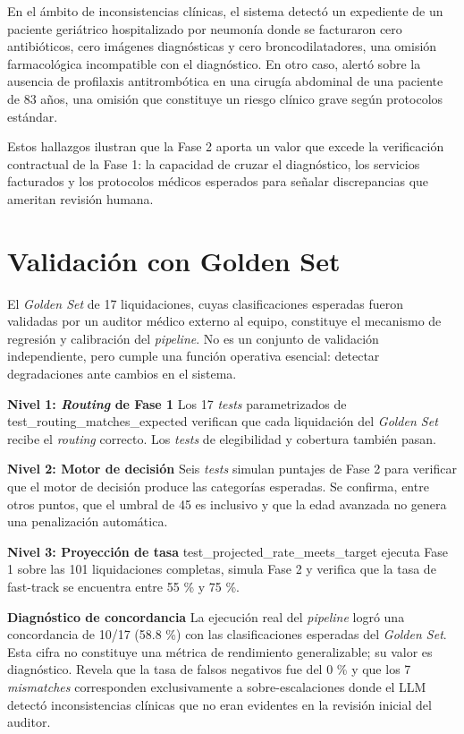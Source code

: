 En el ámbito de inconsistencias clínicas, el sistema detectó un expediente de un paciente geriátrico hospitalizado por neumonía donde se facturaron cero antibióticos, cero imágenes diagnósticas y cero broncodilatadores, una omisión farmacológica incompatible con el diagnóstico. En otro caso, alertó sobre la ausencia de profilaxis antitrombótica en una cirugía abdominal de una paciente de 83 años, una omisión que constituye un riesgo clínico grave según protocolos estándar.

Estos hallazgos ilustran que la Fase 2 aporta un valor que excede la verificación contractual de la Fase 1: la capacidad de cruzar el diagnóstico, los servicios facturados y los protocolos médicos esperados para señalar discrepancias que ameritan revisión humana.

\section{Validación con Golden Set}

El \textit{Golden Set} de 17 liquidaciones, cuyas clasificaciones esperadas fueron validadas por un auditor médico externo al equipo, constituye el mecanismo de regresión y calibración del \textit{pipeline}. No es un conjunto de validación independiente, pero cumple una función operativa esencial: detectar degradaciones ante cambios en el sistema.

\textbf{Nivel 1: \textit{Routing} de Fase 1} Los 17 \textit{tests} parametrizados de test\_routing\_matches\_expected verifican que cada liquidación del \textit{Golden Set} recibe el \textit{routing} correcto. Los \textit{tests} de elegibilidad y cobertura también pasan.

\textbf{Nivel 2: Motor de decisión} Seis \textit{tests} simulan puntajes de Fase 2 para verificar que el motor de decisión produce las categorías esperadas. Se confirma, entre otros puntos, que el umbral de 45 es inclusivo y que la edad avanzada no genera una penalización automática.

\textbf{Nivel 3: Proyección de tasa} test\_projected\_rate\_meets\_target ejecuta Fase 1 sobre las 101 liquidaciones completas, simula Fase 2 y verifica que la tasa de fast-track se encuentra entre 55 \% y 75 \%.

\textbf{Diagnóstico de concordancia} La ejecución real del \textit{pipeline} logró una concordancia de 10/17 (58.8 \%) con las clasificaciones esperadas del \textit{Golden Set}. Esta cifra no constituye una métrica de rendimiento generalizable; su valor es diagnóstico. Revela que la tasa de falsos negativos fue del 0 \% y que los 7 \textit{mismatches} corresponden exclusivamente a sobre-escalaciones donde el LLM detectó inconsistencias clínicas que no eran evidentes en la revisión inicial del auditor.

